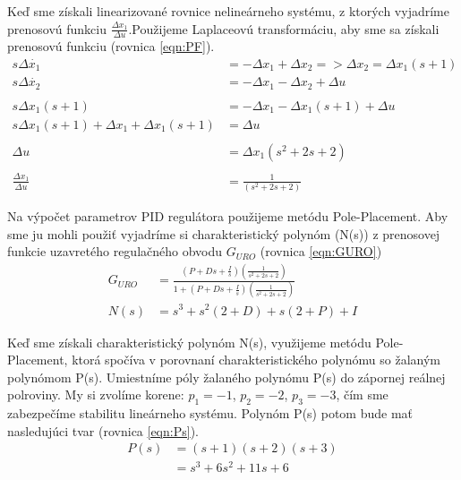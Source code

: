 \documentclass[../main.tex]{subfiles}
\begin{document}
Keď sme získali linearizované rovnice nelineárneho systému, z ktorých vyjadríme prenosovú funkciu $\frac{\Delta x_1}{\Delta u}$.Použijeme Laplaceovú transformáciu, aby sme sa získali prenosovú funkciu (rovnica \ref{eqn:PF}).
\begin{equation}
\begin{aligned} 
s\Delta \dot{x_1}  &= -\Delta x_1 + \Delta x_2 => \Delta x_2 = \Delta x_1(s+1) \\
s\Delta \dot{x_2} & = -\Delta x_1 - \Delta x_2 + \Delta u \\\\
s\Delta x_1(s+1) & = -\Delta x_1 - \Delta x_1(s+1) + \Delta u\\
s\Delta x_1(s+1) + \Delta x_1 + \Delta x_1(s+1) & = \Delta u\\\\
\Delta u & = \Delta x_1(s^2+2s+2)\\\\
\frac{\Delta x_1}{\Delta u} & = \frac{1}{(s^2+2s+2)}\
 \end{aligned}
 \label{eqn:PF}
\end{equation}	

Na výpočet parametrov PID regulátora použijeme metódu Pole-Placement. Aby sme ju mohli použiť vyjadríme si charakteristický polynóm (N(s)) z prenosovej funkcie uzavretého regulačného obvodu ${G_{URO}}$ (rovnica \ref{eqn:GURO})
\begin{equation}
	\begin{aligned}
	G_{URO} &= \frac{(P+Ds+\frac{I}{s})(\frac{1}{s^2+2s+2})}{1+(P+Ds+\frac{I}{s})(\frac{1}{s^2+2s+2})}  \\
		N(s)	&= s^3+s^2(2+D)+s(2+P)+I
	\end{aligned}
	\label{eqn:GURO}
\end{equation}

Keď sme získali charakteristický polynóm N(s), využijeme  metódu Pole-Placement, ktorá spočíva v porovnaní charakteristického polynómu so žalaným polynómom P(s). Umiestníme póly žalaného polynómu P(s) do zápornej reálnej polroviny. My si zvolíme korene: $p_1 = -1$, $p_2 = -2$, $p_3 = -3$, čím sme zabezpečíme stabilitu lineárneho systému. Polynóm P(s) potom bude mať nasledujúci tvar (rovnica \ref{eqn:Ps}). 
\begin{equation}
	\begin{aligned}
	P(s) &= (s + 1)(s + 2)(s + 3) \\
		 &= s^3 + 6s^2 + 11s + 6 \\
	\end{aligned}
\label{eqn:Ps}
\end{equation}
\end{document}
